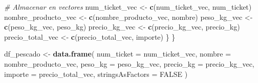 \documentclass[,,,oneauthor,pdftex]{Definitions/mdpi}
\newenvironment{Shaded}{\begin{snugshade}}{\end{snugshade}}
\newcommand{\AttributeTok}[1]{\textcolor[rgb]{0.13,0.29,0.53}{#1}}
\newcommand{\CommentTok}[1]{\textcolor[rgb]{0.56,0.35,0.01}{\textit{#1}}}
\newcommand{\ConstantTok}[1]{\textcolor[rgb]{0.56,0.35,0.01}{#1}}
\newcommand{\FunctionTok}[1]{\textcolor[rgb]{0.13,0.29,0.53}{\textbf{#1}}}
\newcommand{\NormalTok}[1]{#1}
\newcommand{\OtherTok}[1]{\textcolor[rgb]{0.56,0.35,0.01}{#1}}
\begin{document}
\begin{Shaded}
\begin{Highlighting}[]
    \CommentTok{\# Almacenar en vectores}
\NormalTok{    num\_ticket\_vec }\OtherTok{\textless{}{-}} \FunctionTok{c}\NormalTok{(num\_ticket\_vec, num\_ticket)}
\NormalTok{    nombre\_producto\_vec }\OtherTok{\textless{}{-}} \FunctionTok{c}\NormalTok{(nombre\_producto\_vec, nombre)}
\NormalTok{    peso\_kg\_vec }\OtherTok{\textless{}{-}} \FunctionTok{c}\NormalTok{(peso\_kg\_vec, peso\_kg)}
\NormalTok{    precio\_kg\_vec }\OtherTok{\textless{}{-}} \FunctionTok{c}\NormalTok{(precio\_kg\_vec, precio\_kg)}
\NormalTok{    precio\_total\_vec }\OtherTok{\textless{}{-}} \FunctionTok{c}\NormalTok{(precio\_total\_vec, importe)}
\NormalTok{  \}}
\NormalTok{\}}

\NormalTok{df\_pescado }\OtherTok{\textless{}{-}} \FunctionTok{data.frame}\NormalTok{(}
  \AttributeTok{num\_ticket =}\NormalTok{ num\_ticket\_vec,}
  \AttributeTok{nombre =}\NormalTok{ nombre\_producto\_vec,}
  \AttributeTok{peso\_kg =}\NormalTok{ peso\_kg\_vec,}
  \AttributeTok{precio\_kg =}\NormalTok{ precio\_kg\_vec,}
  \AttributeTok{importe =}\NormalTok{ precio\_total\_vec,}
  \AttributeTok{stringsAsFactors =} \ConstantTok{FALSE}
\NormalTok{)}
\end{Highlighting}
\end{Shaded}
\end{document}
